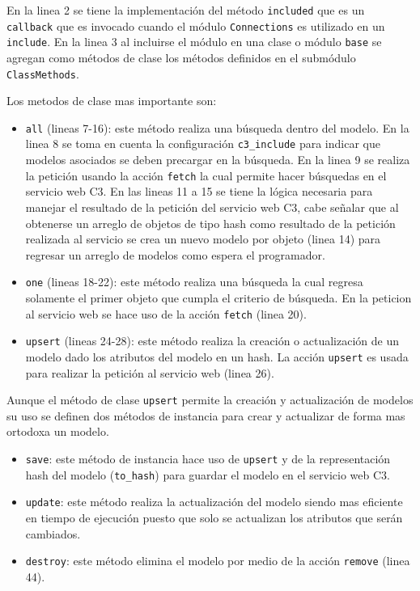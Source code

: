 

En la linea 2 se tiene la implementación del método \texttt{included} que es un
\texttt{callback} que es invocado cuando el módulo \texttt{Connections} es
utilizado en un \texttt{include}. En la linea 3 al incluirse el módulo en una
clase o módulo \texttt{base} se agregan como métodos de clase los métodos
definidos en el submódulo \texttt{ClassMethods}.

Los metodos de clase mas importante son:
\begin{itemize}
\item \texttt{all} (lineas 7-16): este método realiza una búsqueda dentro del modelo.
  En la linea 8 se toma en cuenta la configuración \texttt{c3\_include} para indicar
  que modelos asociados se deben precargar en la búsqueda. En la linea 9 se realiza
  la petición usando la acción \texttt{fetch} la cual permite hacer búsquedas
  en el servicio web C3. En las lineas 11 a 15 se tiene la lógica necesaria para
  manejar el resultado de la petición del servicio web C3, cabe señalar que al
  obtenerse un arreglo de objetos de tipo hash como resultado de la petición
  realizada al servicio se crea un nuevo modelo por objeto (linea 14) para regresar
  un arreglo de modelos como espera el programador.
\item \texttt{one} (lineas 18-22): este método realiza una búsqueda la cual
  regresa solamente el primer objeto que cumpla el criterio de búsqueda. En la
  peticion al servicio web se hace uso de la acción \texttt{fetch} (linea 20).
\item \texttt{upsert} (lineas 24-28): este método realiza la creación o actualización
  de un modelo dado los atributos del modelo en un hash. La acción
  \texttt{upsert} es usada para realizar la petición al servicio web (linea 26).
\end{itemize}

Aunque el método de clase \texttt{upsert} permite la creación y actualización
de modelos su uso se definen dos métodos de instancia para crear y actualizar
de forma mas ortodoxa un modelo.

\begin{itemize}
\item \texttt{save}: este método de instancia hace uso de \texttt{upsert}
  y de la representación hash del modelo (\texttt{to\_hash}) para
  guardar el modelo en el servicio web C3.
\item \texttt{update}: este método realiza la actualización del modelo
  siendo mas eficiente en tiempo de ejecución puesto que solo se actualizan
  los atributos que serán cambiados.
\item \texttt{destroy}: este método elimina el modelo por medio de la acción
  \texttt{remove} (linea 44).
\end{itemize}

